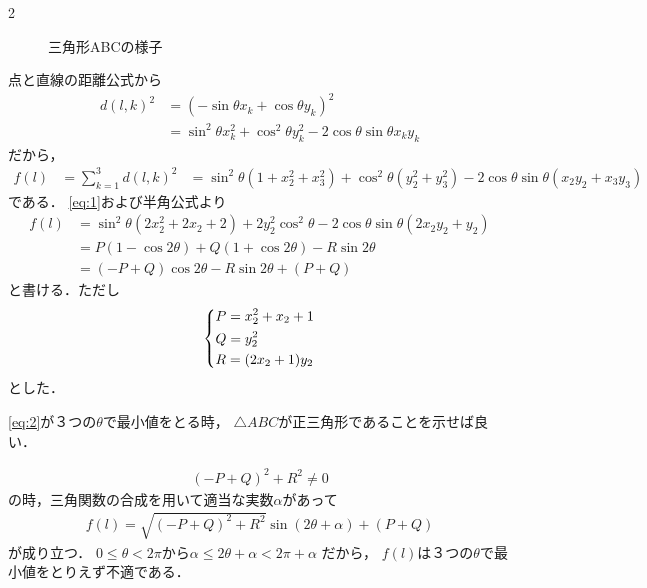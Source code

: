 \documentclass[../../main.tex]{subfiles}
\begin{document}
\begin{multicols}{2}
\begin{figure}[H]
    \caption{三角形ABCの様子}
    \label{1993-2:fig:1}
  \end{figure}

  点と直線の距離公式から
  \begin{align}
    d(l,k)^2
    & = (-\sin\theta x_k+\cos\theta y_k)^2                                  \\
    & = \sin^2\theta x_k^2+\cos^2\theta y_k^2-2\cos\theta \sin\theta x_ky_k
  \end{align}
  だから，
  \begin{align}
    f(l)
    & = \sum_{k=1}^3 d(l,k)^2
    & = \sin^2\theta(1+x_2^2+x_3^2) + \cos^2\theta (y_2^2+y_3^2) - 2\cos\theta\sin\theta (x_2y_2+x_3y_3)
  \end{align}
  である．
  \cref{eq:1}および半角公式より
  \begin{align}
    f(l)
    & = \sin^2\theta (2x_2^2+2x_2+2) + 2y_2^2\cos^2\theta - 2\cos\theta\sin\theta(2x_2y_2+y_2) \\
    & = P(1-\cos2\theta) + Q(1+\cos2\theta) - R\sin2\theta                                     \\
    & = (-P+Q)\cos2\theta - R\sin2\theta + (P+Q) \label{eq:2}
  \end{align}
  と書ける．ただし
  \begin{align}
    \begin{dcases}
      P=x_2^2+x_2+1 \\
      Q=y_2^2       \\
      R=(2x_2+1)y_2
    \end{dcases} \label{eq:3}
  \end{align}
  とした．

  \cref{eq:2}が３つの$\theta$で最小値をとる時，
  $\triangle ABC$が正三角形であることを示せば良い．

  \begin{align}
    (-P+Q)^2+R^2 \neq 0
  \end{align}
  の時，三角関数の合成を用いて適当な実数$\alpha$があって
  \begin{align}
    f(l) = \sqrt{(-P+Q)^2+R^2} \sin(2\theta+\alpha) + (P+Q)
  \end{align}
  が成り立つ．
  $0 \le \theta < 2\pi$から$\alpha \le 2\theta+\alpha < 2\pi+\alpha$ だから，
  $f(l)$は３つの$\theta$で最小値をとりえず不適である．


\end{multicols}
\end{document}
